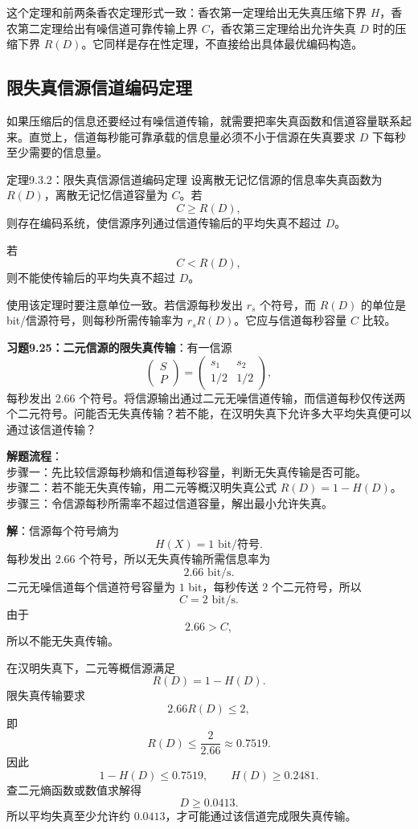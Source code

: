 这个定理和前两条香农定理形式一致：香农第一定理给出无失真压缩下界 $H$，香农第二定理给出有噪信道可靠传输上界 $C$，香农第三定理给出允许失真 $D$ 时的压缩下界 $R(D)$。它同样是存在性定理，不直接给出具体最优编码构造。

\subsection{限失真信源信道编码定理}

如果压缩后的信息还要经过有噪信道传输，就需要把率失真函数和信道容量联系起来。直觉上，信道每秒能可靠承载的信息量必须不小于信源在失真要求 $D$ 下每秒至少需要的信息量。

\begin{theoremBox}{定理9.3.2：限失真信源信道编码定理}
设离散无记忆信源的信息率失真函数为 $R(D)$，离散无记忆信道容量为 $C$。若
\[
C\ge R(D),
\]
则存在编码系统，使信源序列通过信道传输后的平均失真不超过 $D$。

若
\[
C<R(D),
\]
则不能使传输后的平均失真不超过 $D$。
\end{theoremBox}

使用该定理时要注意单位一致。若信源每秒发出 $r_s$ 个符号，而 $R(D)$ 的单位是 bit/信源符号，则每秒所需传输率为 $r_sR(D)$。它应与信道每秒容量 $C$ 比较。

\begin{example}
\label{ex:ch9-binary-source-distortion-transmission}
\textbf{习题9.25：二元信源的限失真传输}：有一信源
\[
\begin{pmatrix}
S\\ P
\end{pmatrix}
=
\begin{pmatrix}
s_1&s_2\\
1/2&1/2
\end{pmatrix},
\]
每秒发出 $2.66$ 个符号。将信源输出通过二元无噪信道传输，而信道每秒仅传送两个二元符号。问能否无失真传输？若不能，在汉明失真下允许多大平均失真便可以通过该信道传输？

\noindent \textbf{解题流程}：\\[2pt]
步骤一：先比较信源每秒熵和信道每秒容量，判断无失真传输是否可能。\\
步骤二：若不能无失真传输，用二元等概汉明失真公式 $R(D)=1-H(D)$。\\
步骤三：令信源每秒所需率不超过信道容量，解出最小允许失真。

\textbf{解}：信源每个符号熵为
\[
H(X)=1\text{ bit/符号}.
\]
每秒发出 $2.66$ 个符号，所以无失真传输所需信息率为
\[
2.66\text{ bit/s}.
\]
二元无噪信道每个信道符号容量为 $1$ bit，每秒传送 $2$ 个二元符号，所以
\[
C=2\text{ bit/s}.
\]
由于
\[
2.66>C,
\]
所以不能无失真传输。

在汉明失真下，二元等概信源满足
\[
R(D)=1-H(D).
\]
限失真传输要求
\[
2.66R(D)\le2,
\]
即
\[
R(D)\le\frac{2}{2.66}\approx0.7519.
\]
因此
\[
1-H(D)\le0.7519,
\qquad
H(D)\ge0.2481.
\]
查二元熵函数或数值求解得
\[
D\ge0.0413.
\]
所以平均失真至少允许约 $0.0413$，才可能通过该信道完成限失真传输。
\end{example}

